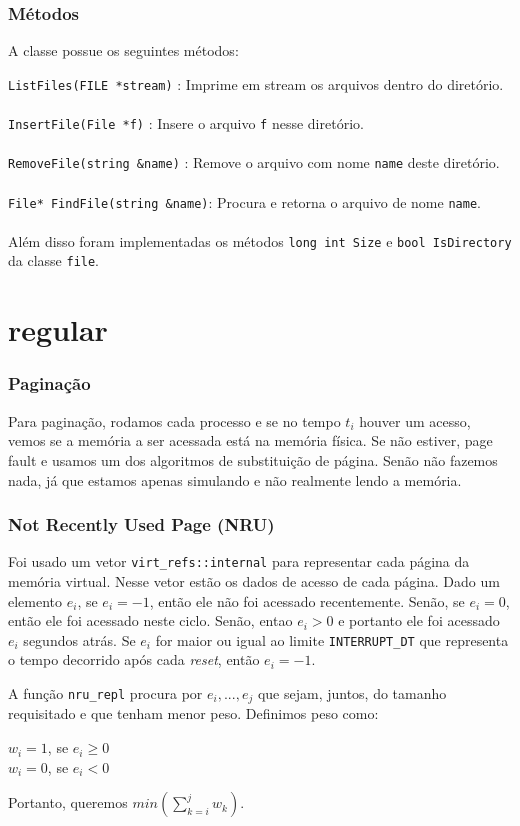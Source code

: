 \documentclass{beamer}
\begin{document}
\begin{frame}
	\frametitle{Métodos}
	A classe possue os seguintes métodos:
	
	\texttt{ListFiles(FILE *stream)}     : Imprime em stream os arquivos dentro do diretório. \\~\\
	\texttt{InsertFile(File *f)}         : Insere o arquivo \texttt{f} nesse diretório.\\~\\
	\texttt{RemoveFile(string &name)}    : Remove o arquivo com nome \texttt{name} deste diretório.\\~\\
	\texttt{File* FindFile(string &name)}: Procura e retorna o arquivo de nome \texttt{name}.\\~\\ 
	
	
	Além disso foram implementadas os métodos \texttt{long int Size} e \texttt{bool IsDirectory} da classe \texttt{file}. 
\end{frame}


\section{regular}

\begin{frame}
  \frametitle{Paginação}
  Para paginação, rodamos cada processo e se no tempo $t_i$ houver um acesso, vemos se a memória a
  ser acessada está na memória física. Se não estiver, page fault e usamos um dos algoritmos de
  substituição de página. Senão não fazemos nada, já que estamos apenas simulando e não realmente
  lendo a memória.
\end{frame}


\begin{frame}
  \frametitle{Not Recently Used Page (NRU)}
  Foi usado um vetor \texttt{virt\_refs::internal} para representar cada página da memória virtual.
  Nesse vetor estão os dados de acesso de cada página. Dado um elemento $e_i$, se $e_i=-1$, então
  ele não foi acessado recentemente. Senão, se $e_i=0$, então ele foi acessado neste ciclo. Senão,
  entao $e_i>0$ e portanto ele foi acessado $e_i$ segundos atrás. Se $e_i$ for maior ou igual ao
  limite \texttt{INTERRUPT\_DT} que representa o tempo decorrido após cada \textit{reset}, então
  $e_i=-1$.

  A função \texttt{nru\_repl} procura por $e_i,...,e_j$ que sejam, juntos, do tamanho requisitado e
  que tenham menor peso. Definimos peso como:

  $w_i = 1$, se $e_i \geq 0$ \\
  $w_i = 0$, se $e_i < 0$

  Portanto, queremos $min(\sum_{k=i}^j w_k)$.
\end{frame}
\end{document}
